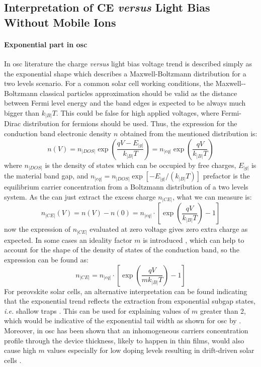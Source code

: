 	\subsection{Interpretation of CE \textsl{versus} Light Bias Without Mobile Ions}

		\paragraph{Exponential part in \gls{osc}}\label{ce_exp_osc}
		In \gls{osc} literature the charge \textsl{versus} light bias voltage trend is described simply as the exponential shape which describes a Maxwell\hyp{}Boltzmann distribution for a two levels scenario.
		For a common solar cell working conditions, the Maxwell\hyp{}-Boltzmann classical particles approximation should be valid as the distance between Fermi level energy and the band edges is expected to be always much bigger than $k_|B|T$.
		This could be false for high applied voltages, where Fermi\hyp{}Dirac distribution for fermions should be used.
		Thus, the expression for the conduction band electronic density $n$ obtained from the mentioned distribution is:
		\begin{equation}
		n(V) = n_|DOS| \exp(\frac{qV - E_|g|}{k_|B|T}) = n_|eq| \exp(\frac{qV}{k_|B|T})
		\end{equation}
		where $n_|DOS|$ is the density of states which can be occupied by free charges, $E_|g|$ is the material band gap, and $n_|eq|=n_|DOS|\exp[-E_|g|/(k_|B|T)]$ prefactor is the equilibrium carrier concentration from a Boltzmann distribution of a two levels system. %
		As the  can just extract the excess charge $n_|CE|$, what we can measure is:
		\begin{equation}
		n_|CE|(V) = n(V)-n(0) = n_|eq| \cdot \left[\exp(\frac{qV}{k_|B|T})-1\right]
		\end{equation}
		now the expression of $n_|CE|$ evaluated at zero voltage gives zero extra charge as expected.
		In some cases an ideality factor $m$ is introduced \cite{Kirchartz2012}, which can help to account for the shape of the density of states of the conduction band, so the expression can be found as:
		\begin{equation}\label{eq:ce_osc}
			n_|CE| = n_|eq| \cdot \left[\exp(\frac{qV}{mk_|B|T})-1\right]
		\end{equation}
		For perovskite solar cells, an alternative interpretation can be found indicating that the exponential trend reflects the extraction from exponential subgap states, \textsl{i.e.} shallow traps \cite{Du2018}.
		This can be used for explaining values of $m$ greater than 2, which would be indicative of the exponential tail width as shown for \gls{osc} by .
		Moreover, in \gls{osc} has been shown that an inhomogeneous carriers concentration profile through the device thickness, likely to happen in thin films, would also cause high $m$ values \cite{Kirchartz2012} especially for low doping levels resulting in drift\hyp{}driven solar cells \cite{Deledalle2015,Deledalle2014}.
		
